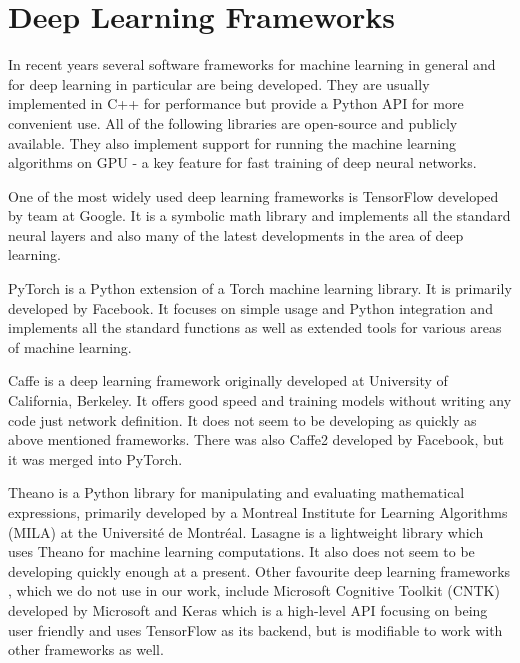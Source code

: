 \section{Deep Learning Frameworks}
In recent years several software frameworks for machine learning in general and for deep learning in particular are being developed. They are usually implemented in C++ for performance but provide a Python API for more convenient use. All of the following libraries are open-source and publicly available. They also implement support for running the machine learning algorithms on GPU - a key feature for fast training of deep neural networks. \par
One of the most widely used deep learning frameworks is TensorFlow \cite{martin_abadi_tensorflow:_2015} developed by team at Google. It is a symbolic math library and implements all the standard neural layers and also many of the latest developments in the area of deep learning.  \par
PyTorch \cite{paszke_automatic_2017} is a Python extension of a Torch machine learning library. It is primarily developed by Facebook. It focuses on simple usage and Python integration and implements all the standard functions as well as extended tools for various areas of machine learning. \par
Caffe \cite{jia_caffe:_2014} is a deep learning framework originally developed at University of California, Berkeley. It offers good speed and training models without writing any code just network definition. It does not seem to be developing as quickly as above mentioned frameworks. There was also Caffe2 developed by Facebook, but it was merged into PyTorch. \par
Theano \cite{theano_development_team_theano:_2016} is a Python library for manipulating and evaluating mathematical expressions, primarily developed by a Montreal Institute for Learning Algorithms (MILA) at the Université de Montréal. Lasagne \cite{dieleman_lasagne:_2015} is a lightweight library which uses Theano for machine learning computations. It also does not seem to be developing quickly enough at a present. 
Other favourite deep learning frameworks	, which we do not use in our work, include Microsoft Cognitive Toolkit (CNTK) \cite{seide_cntk:_2016} developed by Microsoft and Keras \cite{chollet_keras_2015} which is a high-level API focusing on being user friendly and uses TensorFlow as its backend, but is modifiable to work with other frameworks as well.

